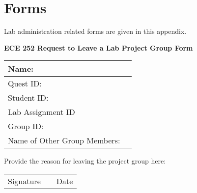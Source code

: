 \chapter{Forms}
Lab administration related forms are given in this appendix.
\newpage
\begin{center}
{\bf ECE 252 Request to Leave a Lab Project Group Form}
\end{center}

\begin{table*}[h]
    \begin{center}
          \begin{tabular}{|p{6cm}|p{6cm}|}
          \hline
          Name:             & \\ \hline
          Quest ID:         & \\ \hline
          Student ID:       & \\ \hline
          Lab Assignment ID & \\ \hline
          Group ID:         & \\ \hline
          Name of Other Group Members: & \\ \hline
          \end{tabular}
    \end{center}
\end{table*}

Provide the reason for leaving the project group here:

\vspace{9cm}

\begin{table*}
\begin{center}
\begin{tabular}{p{6cm} p{1cm} p{6cm}}
Signature && Date \\
\cline{1-1}
\cline{3-3}
\end{tabular}
\end{center}
\end{table*}

